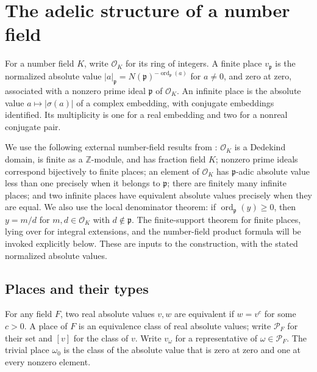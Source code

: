 \section{The adelic structure of a number field}

For a number field $K$, write $\mathcal O_K$ for its ring of integers.
A finite place $v_{\mathfrak p}$ is the normalized absolute value
$|a|_{\mathfrak p}=N(\mathfrak p)^{-\operatorname{ord}_{\mathfrak p}(a)}$
for $a\ne0$, and zero at zero, associated with a nonzero prime ideal
$\mathfrak p$ of $\mathcal O_K$.
An infinite place is the absolute value $a\mapsto|\sigma(a)|$ of a complex
embedding, with conjugate embeddings identified. Its multiplicity is one
for a real embedding and two for a nonreal conjugate pair.

We use the following external number-field results from
\cite{mathlib-number-fields}: $\mathcal O_K$ is a Dedekind domain, is finite
as a $\mathbb Z$-module, and has fraction field $K$; nonzero prime ideals
correspond bijectively to finite places; an element of $\mathcal O_K$ has
$\mathfrak p$-adic absolute value less than one precisely when it belongs
to $\mathfrak p$; there are finitely many infinite places; and two infinite
places have equivalent absolute values precisely when they are equal.
We also use the local denominator theorem: if
$\operatorname{ord}_{\mathfrak p}(y)\geq0$, then $y=m/d$ for
$m,d\in\mathcal O_K$ with $d\notin\mathfrak p$. The finite-support theorem
for finite places, lying over for integral extensions, and the number-field
product formula will be invoked explicitly below. These are inputs to the
construction, with the stated normalized absolute values.

\subsection{Places and their types}

\begin{definition}[Places]\label{def:places}
\leanok
{}
For any field $F$, two real absolute values $v,w$ are equivalent if
$w=v^c$ for some $c>0$. A place of $F$ is an equivalence class of real
absolute values; write $\mathcal P_F$ for their set and $[v]$ for the class
of $v$. Write $v_\omega$ for a representative of $\omega\in\mathcal P_F$.
The trivial place $\omega_0$ is the class of the absolute value that is
zero at zero and one at every nonzero element.
\end{definition}

